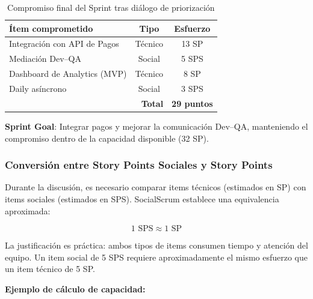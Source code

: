 \begin{table}[h]
    \centering
    \small
    \begin{tabularx}{\textwidth}{|X|c|c|}
        \hline
        \textbf{Ítem comprometido}           & \textbf{Tipo}      & \textbf{Esfuerzo} \\
        \hline
        Integración con API de Pagos         & Técnico            & 13 SP             \\
        \hline
        Mediación Dev--QA                    & Social             & 5 SPS             \\
        \hline
        Dashboard de Analytics (MVP)         & Técnico            & 8 SP              \\
        \hline
        Daily asíncrono                      & Social             & 3 SPS             \\
        \hline
        \multicolumn{2}{|r|}{\textbf{Total}} & \textbf{29 puntos}                     \\
        \hline
    \end{tabularx}
    \caption{Compromiso final del Sprint tras diálogo de priorización}
    \label{tab:decision-sprint-dialogo}
\end{table}
\FloatBarrier

\textbf{Sprint Goal}: Integrar pagos y mejorar la comunicación Dev--QA, manteniendo el compromiso dentro de la capacidad disponible (32 SP).

\subsubsection{Conversión entre Story Points Sociales y Story Points}

Durante la discusión, es necesario comparar items técnicos (estimados en SP) con items sociales (estimados en SPS). SocialScrum establece una equivalencia aproximada:

\begin{equation}
    1 \text{ SPS} \approx 1 \text{ SP}
\end{equation}

La justificación es práctica: ambos tipos de items consumen tiempo y atención del equipo. Un item social de 5 SPS requiere aproximadamente el mismo esfuerzo que un item técnico de 5 SP.

\textbf{Ejemplo de cálculo de capacidad:}

